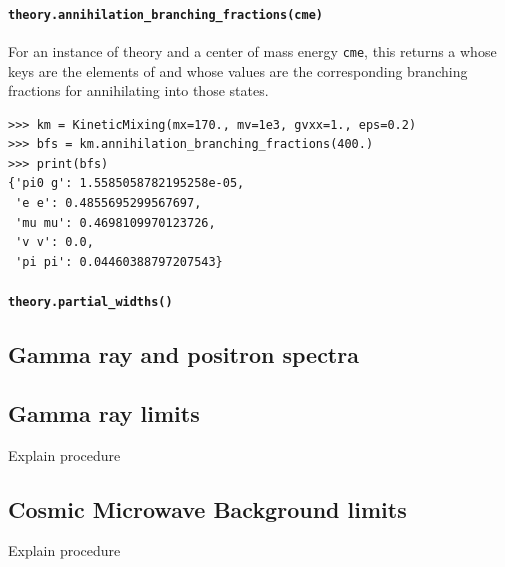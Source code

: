\paragraph{\texttt{theory.annihilation\_branching\_fractions(cme)}} For an instance  of theory and a center of mass energy \texttt{cme}, this returns a  whose keys are the elements of  and whose values are the corresponding branching fractions for annihilating into those states.
\begin{verbatim}
>>> km = KineticMixing(mx=170., mv=1e3, gvxx=1., eps=0.2)
>>> bfs = km.annihilation_branching_fractions(400.)
>>> print(bfs)
{'pi0 g': 1.5585058782195258e-05,
 'e e': 0.4855695299567697,
 'mu mu': 0.4698109970123726,
 'v v': 0.0,
 'pi pi': 0.04460388797207543}
\end{verbatim}


\paragraph{\texttt{theory.partial\_widths()}}

\subsection{Gamma ray and positron spectra}

\subsection{Gamma ray limits}

Explain procedure

\subsection{Cosmic Microwave Background limits}

Explain procedure

